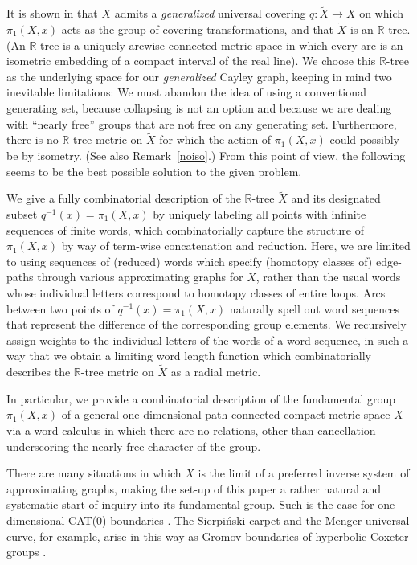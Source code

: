 \documentclass{amsart}
\theoremstyle{definition}
\theoremstyle{remark}
\numberwithin{equation}{section}
\begin{document}
It is shown in \cite[Theorem 4.10 and Example 4.14]{FZ2} that $X$ admits a {\sl generalized} universal covering  $q:\tilde{X}\rightarrow X$ on which  $\pi_1(X,x)$ acts as the group of covering transformations, and
that $\tilde{X}$ is an $\mathbb{R}$-tree. (An $\mathbb{R}$-tree is a uniquely arcwise connected metric space in which every arc is an isometric embedding of a compact interval of the real line). We choose this $\mathbb{R}$-tree as the underlying space for our {\sl generalized} Cayley graph, keeping in mind two inevitable limitations: We must abandon the idea of using a conventional generating set, because collapsing is not an option and because we are dealing with ``nearly free''  groups that are not free on any generating set. Furthermore, there is no $\mathbb{R}$-tree metric on $\tilde{X}$ for which the action of $\pi_1(X,x)$ could possibly be by isometry. (See also Remark~\ref{noiso}.) From this point of view, the following seems to be the best possible solution to the given problem.

We give a fully combinatorial description of the $\mathbb{R}$-tree $\tilde{X}$ and its designated subset  $q^{-1}(x)=\pi_1(X,x)$ by
uniquely labeling all points with infinite sequences of finite words, which combinatorially capture the
structure of $\pi_1(X,x)$ by way of term-wise concatenation and reduction. Here, we are limited to using
 sequences of (reduced) words which specify (homotopy classes of) edge-paths through various approximating graphs for $X$, rather than the usual words whose individual letters correspond to homotopy classes of entire loops.  Arcs between two points of $q^{-1}(x)=\pi_1(X,x)$ naturally spell out word sequences that represent the difference of the corresponding group elements. We recursively assign weights to the individual letters of the words of a word sequence, in such a way that we obtain a limiting word length function which combinatorially describes the  $\mathbb{R}$-tree metric on $\tilde{X}$ as a radial metric.

In particular, we provide a combinatorial description of the fundamental group  $\pi_1(X,x)$ of a general one-dimensional path-connected compact metric space $X$ via a word calculus in which there are no relations, other than cancellation---underscoring the nearly free character of the group.

There are many situations in which $X$ is the limit of a preferred inverse system of approximating graphs, making the set-up of this paper a rather natural and systematic start of inquiry into its fundamental group. Such is the case for one-dimensional CAT(0) boundaries \cite{BH,CF}. The Sierpi\'nski carpet and the Menger universal curve, for example, arise in this way as Gromov boundaries of hyperbolic Coxeter groups \cite{B,KB}.
\end{document}
